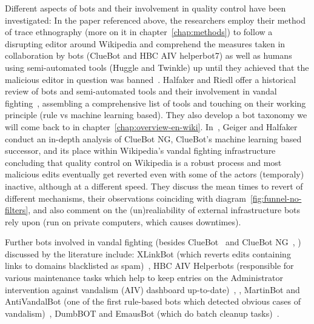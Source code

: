 Different aspects of bots and their involvement in quality control have been investigated:
In the paper referenced above, the researchers employ their method of trace ethnography (more on it in chapter~\ref{chap:methods}) to follow a disrupting editor around Wikipedia and comprehend the measures taken in collaboration by bots (ClueBot and HBC AIV helperbot7) as well as humans using semi-automated tools (Huggle and Twinkle) up until they achieved that the malicious editor in question was banned~\cite{GeiRib2010}.
Halfaker and Riedl offer a historical review of bots and semi-automated tools and their involvement in vandal fighting~\cite{HalRied2012}, assembling a comprehensive list of tools and touching on their working principle (rule vs machine learning based).
They also develop a bot taxonomy we will come back to in chapter~\ref{chap:overview-en-wiki}. %
In~\cite{GeiHal2013}, Geiger and Halfaker conduct an in-depth analysis of ClueBot NG, ClueBot's machine learning based successor, and its place within Wikipedia's vandal fighting infrastructure concluding that quality control on Wikipedia is a robust process and most malicious edits eventually get reverted even with some of the actors (temporaly) inactive, although at a different speed.
They discuss the mean times to revert of different mechanisms, their observations coinciding with diagram~\ref{fig:funnel-no-filters},
and also comment on the (un)realiability of external infrastructure bots rely upon (run on private computers, which causes downtimes).

Further bots involved in vandal fighting (besides ClueBot~\cite{GeiRib2010} and ClueBot NG~\cite{GeiHal2013}, \cite{HalRied2012}) discussed by the literature include:
XLinkBot (which reverts edits containing links to domains blacklisted as spam)~\cite{HalRied2012},
HBC AIV Helperbots (responsible for various maintenance tasks which help to keep entries on the Administrator intervention against vandalism (AIV) dashboard up-to-date)~\cite{HalRied2012}, \cite{GeiRib2010},
MartinBot and AntiVandalBot (one of the first rule-based bots which detected obvious cases of vandalism)~\cite{HalRied2012},
DumbBOT and EmausBot (which do batch cleanup tasks)~\cite{GeiHal2013}.

